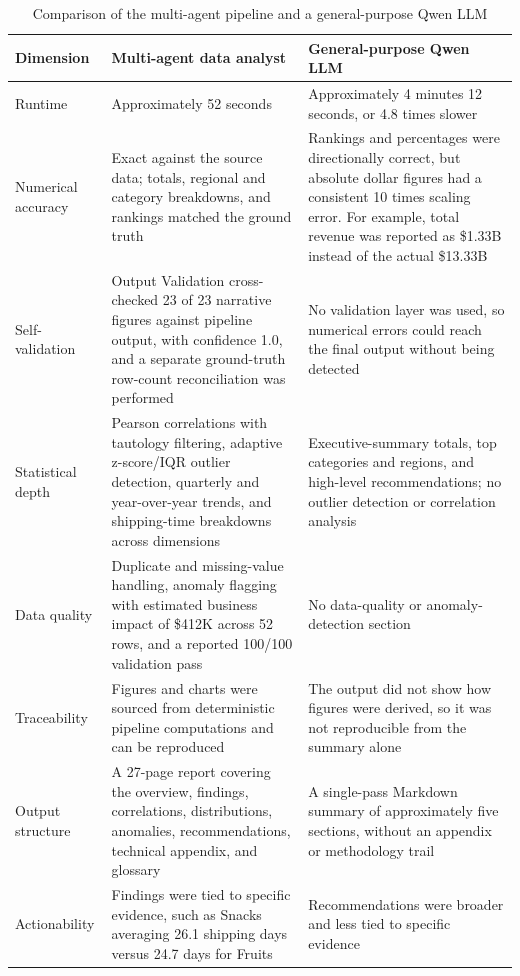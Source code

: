 \documentclass[12pt,a4paper,openany]{report}
\begin{document}
\begin{table}[H]
\centering
\footnotesize
\setlength{\tabcolsep}{3pt}
\caption{Comparison of the multi-agent pipeline and a general-purpose Qwen LLM}
\label{tab:qwen-comparison}
\begin{tabular}{p{3.2cm} p{5.1cm} p{5.1cm}}
\hline
Dimension & Multi-agent data analyst & General-purpose Qwen LLM \\
\hline
Runtime & Approximately 52 seconds & Approximately 4 minutes 12 seconds, or 4.8 times slower \\
Numerical accuracy & Exact against the source data; totals, regional and category breakdowns, and rankings matched the ground truth & Rankings and percentages were directionally correct, but absolute dollar figures had a consistent 10 times scaling error. For example, total revenue was reported as \$1.33B instead of the actual \$13.33B \\
Self-validation & Output Validation cross-checked 23 of 23 narrative figures against pipeline output, with confidence 1.0, and a separate ground-truth row-count reconciliation was performed & No validation layer was used, so numerical errors could reach the final output without being detected \\
Statistical depth & Pearson correlations with tautology filtering, adaptive z-score/IQR outlier detection, quarterly and year-over-year trends, and shipping-time breakdowns across dimensions & Executive-summary totals, top categories and regions, and high-level recommendations; no outlier detection or correlation analysis \\
Data quality & Duplicate and missing-value handling, anomaly flagging with estimated business impact of \$412K across 52 rows, and a reported 100/100 validation pass & No data-quality or anomaly-detection section \\
Traceability & Figures and charts were sourced from deterministic pipeline computations and can be reproduced & The output did not show how figures were derived, so it was not reproducible from the summary alone \\
Output structure & A 27-page report covering the overview, findings, correlations, distributions, anomalies, recommendations, technical appendix, and glossary & A single-pass Markdown summary of approximately five sections, without an appendix or methodology trail \\
Actionability & Findings were tied to specific evidence, such as Snacks averaging 26.1 shipping days versus 24.7 days for Fruits & Recommendations were broader and less tied to specific evidence \\
\hline
\end{tabular}
\end{table}
\end{document}
